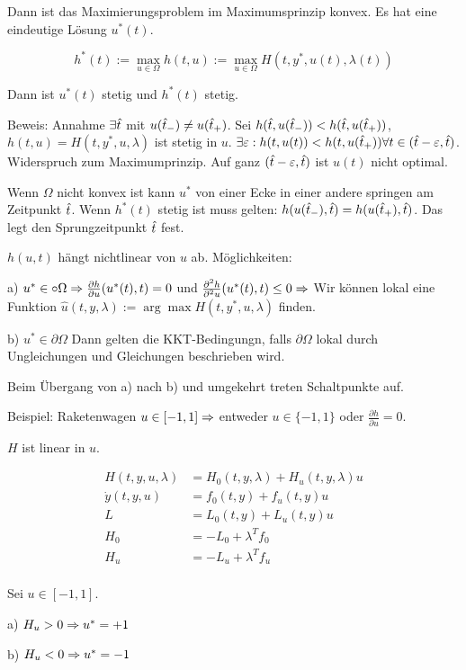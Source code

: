 Dann ist das Maximierungsproblem im Maximumsprinzip konvex. Es hat eine eindeutige Lösung $u^*(t)$.

\[ h^*(t) := \max_{u\in\Omega} h(t,u) := \max_{u\in \Omega} H(t,y^*,u(t),\lambda(t)) \]

Dann ist $u^*(t)$ stetig und $h^*(t)$ stetig.

Beweis: Annahme $\exists {\hat t}$ mit $u({\hat t}_-) \neq u({\hat t}_+)$. Sei $h({\hat t}, u({\hat t}_-)) < h({\hat t}, u({\hat t}_+))$, $h(t,u) = H(t,y^*, u, \lambda)$ ist stetig in $u$. $\exists \varepsilon: h(t,u(t)) < h(t,u({\hat t}_+)) \forall t \in ({\hat t}-\varepsilon,{\hat t})$. Widerspruch zum Maximumprinzip. Auf ganz $({\hat t}-\varepsilon,{\hat t})$ ist $u(t)$ nicht optimal.

Wenn $\Omega$ nicht konvex ist kann $u^*$ von einer Ecke in einer andere springen am Zeitpunkt ${\hat t}$. Wenn $h^*(t)$ stetig ist muss gelten: $h(u({\hat t}_-),{\hat t}) = h(u({\hat t}_+),{\hat t})$. Das legt den Sprungzeitpunkt ${\hat t}$ fest.

$h(u,t)$ hängt nichtlinear von $u$ ab. Möglichkeiten:

\bitm
\item a) $u^* \in \circ{\Omega} \Rightarrow \frac{\partial h}{\partial u} (u^*(t),t) = 0$ und $\frac{\partial^2 h}{\partial^2 u} (u^*(t), t) \leq 0 \Rightarrow$ Wir können lokal eine Funktion $\hat u(t,y,\lambda) := \arg\max H(t,y^*,u,\lambda)$ finden.
\item b) $u^* \in \partial \Omega$ Dann gelten die KKT-Bedingungn, falls $\partial \Omega$ lokal durch Ungleichungen und Gleichungen beschrieben wird.
\eitm

Beim Übergang von a) nach b) und umgekehrt treten Schaltpunkte auf.

Beispiel: Raketenwagen $u \in [-1,1] \Rightarrow$ entweder $u \in \{-1,1\}$ oder $\frac{\partial h}{\partial u} = 0$.

$H$ ist linear in $u$.

\begin{align*}
H(t,y,u,\lambda) &= H_0(t,y,\lambda) + H_u (t,y,\lambda) u \\
\dot y(t,y,u) &= f_0 (t,y) + f_u(t,y)u \\
L &= L_0(t,y) + L_u(t,y)u \\
H_0 &= - L_0 + \lambda^T f_0 \\
H_u &= - L_u + \lambda^T f_u \\
\end{align*}

Sei \zb $u\in[-1,1]$.

\bitm
\item a) $H_u > 0 \Rightarrow u^* = +1$
\item b) $H_u < 0 \Rightarrow u^* = -1$
\eitm


